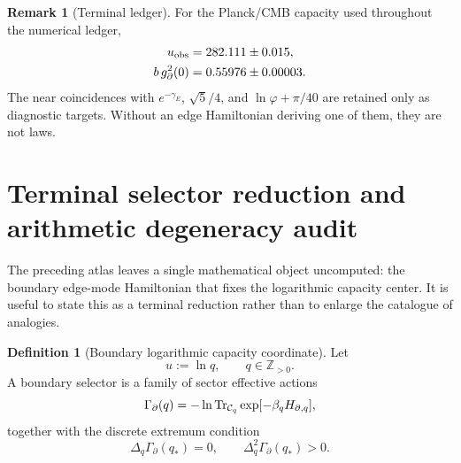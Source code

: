 \documentclass[aps,prd,reprint,nofootinbib,superscriptaddress,floatfix]{revtex4-2}
\numberwithin{equation}{section}
\theoremstyle{definition}
\newtheorem{definition}{Definition}[section]
\newtheorem{remark}{Remark}[section]
\theoremstyle{plain}
\begin{document}
\begin{remark}[Terminal ledger]
For the Planck/CMB capacity used throughout the numerical ledger,
\begin{align}
u_{\rm obs}&=282.111\pm0.015,\\
b\,g_\partial^2(0)&=0.55976\pm0.00003 .
\end{align}
The near coincidences with \(e^{-\gamma_E}\), \(\sqrt5/4\), and
\(\ln\varphi+\pi/40\) are retained only as diagnostic targets.  Without an
edge Hamiltonian deriving one of them, they are not laws.
\end{remark}




\section{Terminal selector reduction and arithmetic degeneracy audit}

The preceding atlas leaves a single mathematical object uncomputed: the
boundary edge-mode Hamiltonian that fixes the logarithmic capacity center.
It is useful to state this as a terminal reduction rather than to enlarge
the catalogue of analogies.

\begin{definition}[Boundary logarithmic capacity coordinate]
Let
\begin{equation}
        u:=\ln q,
        \qquad q\in\mathbb Z_{>0}.
\end{equation}
A boundary selector is a family of sector effective actions
\begin{equation}
        \Gamma_\partial(q)
        =
        -\ln {\rm Tr}_{\mathcal C_q}
        \exp[-\beta_q H_{\partial,q}],
\end{equation}
together with the discrete extremum condition
\begin{equation}
        \Delta_q\Gamma_\partial(q_*)=0,
        \qquad
        \Delta_q^2\Gamma_\partial(q_*)>0 .
\end{equation}
\end{definition}
\end{document}
